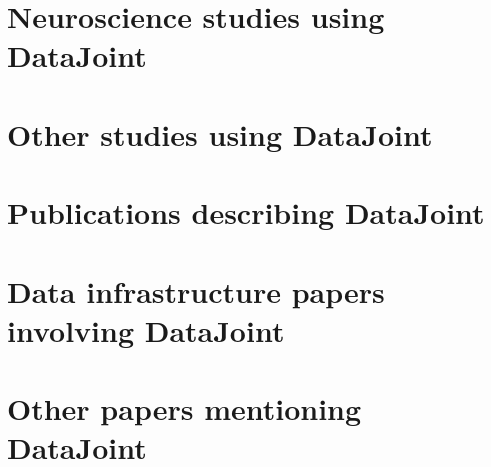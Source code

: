 \documentclass[letter,10pt]{article}
\begin{document}
\section*{Neuroscience studies using DataJoint}
\cite{aguillon2020standardized,
			angelaki2020gravity,
			baden2016functional,
			bae2021functional,
			born2021corticothalamic,
			burg2021learning,
			cadena2019deep,
			cadwell2016,
			chettih2019single,
			claudi2021innate, %
			cohrs2021investigation,
			cotton-2013,
			cotton2020factorized,
			cotton2022spatiotemporal,
			denfield2018attentional,
			ecker-2014,
			ecker2018rotation,
			erisken2014effects,
			fahey2019global,
			franke-2017,
			franke2021behavioral,
			froudarakis_population_2014,
			heath2020circuit,
			jacobsen2021all,
			jiang_principles_2015,
			jurjut2017learning,
			khastkhodaei2016mice,
			laboratory2021standardized,
			laturnus2020systematic,
			laurens2019multiplexed,
			liu2019target,
			obenhaus2021functional,
			reimer-2016,
			reimer2014pupil,
			roson2019mouse,
			shan2016spatial,
			shan2017model,
			sinz2018stimulus,
			sinz2020simultaneous,
			spacek2019robust,
			strauss2021center,
			subramaniyan2021fear,
			urai2021citric,
			vaiceliunaite2013spatial,
			wal2021evaluating,
			walker2018inception,
			walker2019inception,
			wang2021modeling,
			yatsenko2015a,
			yatsenko2020signal,
			zhao2020temporal}

\section*{Other studies using DataJoint}
\cite{hartmann2016alternative}

\section*{Publications describing DataJoint}
\cite{singer2019,
			yatsenko-2015-datajoint,
			yatsenko-2018-datajoint,
			yatsenko-2021-datajoint}

\section*{Data infrastructure papers involving DataJoint}
\cite{bonacchi2019data}

\section*{Other papers mentioning DataJoint}
\cite{abe2021neuroscience,
			charles2020toward,
			dennis2021systems,
			hering2019slide,
			jevzek2020nwb,
			johnson2019toward,
			kohn2021flexible,
			lepperod2020experimental,
			matelsky2021integrated,
			murillo2021ndi,
			narayanan2018engineering,
			paninski2018neural,
			roson2018functional,
			sprenger2019odmltables,
			wool2020knowledge}



\end{document}
